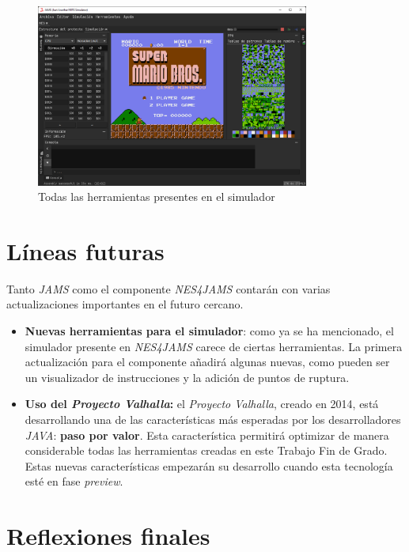 \begin{figure}[h]
    \centering
    \includegraphics[width=0.8\textwidth]{images/conclusions/nes-simulator-tools}
    \caption{Todas las herramientas presentes en el simulador}
    \label{fig:nes-conclusions-tools}
\end{figure}

\section{Líneas futuras}\label{sec:líneas-futuras}

Tanto \textit{JAMS} como el componente \textit{NES4JAMS}
contarán con varias actualizaciones importantes en
el futuro cercano.

\begin{itemize}
    \item \textbf{Nuevas herramientas para el simulador}:
    como ya se ha mencionado, el simulador presente en
    \textit{NES4JAMS} carece de ciertas herramientas.
    La primera actualización para el componente añadirá
    algunas nuevas, como pueden ser un visualizador
    de instrucciones y la adición de puntos de ruptura.
    \item \textbf{Uso del \textit{Proyecto Valhalla}:} el
    \textit{Proyecto Valhalla}\cite{PROJECT_VALHALLA}, creado en 2014,
    está desarrollando una de las características más esperadas
    por los desarrolladores \textit{JAVA}: \textbf{paso por valor}.
    Esta característica permitirá optimizar de manera considerable
    todas las herramientas creadas en este Trabajo Fin
    de Grado.
    Estas nuevas características empezarán su desarrollo cuando esta
    tecnología esté en fase \textit{preview}.
\end{itemize}

\section{Reflexiones finales}\label{sec:reflexiones-finales}


